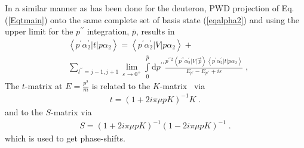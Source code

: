In a similar manner as has been done for the deuteron, PWD projection of Eq. (\ref{Eqtmain}) onto the same complete set of basis state (\ref{eqalpha2}) and using the upper limit for the $p^{\prime\prime}$ integration, $\bar{p}$, results in
\begin{equation}
\begin{split}
&\left<p^{\prime}\alpha^{\prime}_{2}|t|p\alpha_{2}\right> = \left<p^{\prime}\alpha^{\prime}_{2}|V|p\alpha_{2}\right> + \\& \sum\limits_{l^{\prime\prime} = j-1, j+1}\lim\limits_{\varepsilon \rightarrow 0^{+}}\int\limits_{0}^{\bar{p}}\mathrm{d}p^{\prime\prime}
\frac{p^{\prime\prime 2}
\left<p^{\prime\prime}\alpha^{\prime}_{2}|V|\!\vec{\,p}\right>\left<p^{\prime}\alpha^{\prime}_{2}|t|p\alpha_{2}\right>}{E_{p^{\prime}}- E_{p^{\prime\prime}} + i\varepsilon }\;,
\end{split}
\label{Eqtmain2}
\end{equation}
The $t$-matrix at $E = \frac{p^{2}}{m}$ is related to the $K$-matrix~\cite{glockle1983quantum} via
\begin{equation}
\begin{split}
t = (1 + 2i\pi \mu p K)^{-1}K\;.
\end{split}
\label{Eqkmain}
\end{equation}
and to the $S$-matrix via
\begin{equation}
\begin{split}
S = (1 + 2i\pi \mu p K)^{-1}(1 - 2i\pi \mu p K)^{-1}\;.
\end{split}
\label{EqSmain}
\end{equation}
which is used to get phase-shifts. 

